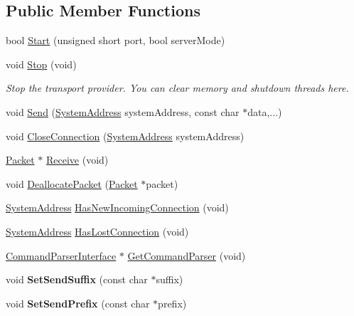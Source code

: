 \subsection*{Public Member Functions}
\begin{DoxyCompactItemize}
\item 
bool \hyperlink{class_rak_net_1_1_telnet_transport_ac7e1ba9b678c42a55d695eb95d734c1f}{Start} (unsigned short port, bool server\-Mode)
\item 
\hypertarget{class_rak_net_1_1_telnet_transport_aed8b626c88d646661364c04fcd3bce42}{void \hyperlink{class_rak_net_1_1_telnet_transport_aed8b626c88d646661364c04fcd3bce42}{Stop} (void)}\label{class_rak_net_1_1_telnet_transport_aed8b626c88d646661364c04fcd3bce42}

\begin{DoxyCompactList}\small\item\em Stop the transport provider. You can clear memory and shutdown threads here. \end{DoxyCompactList}\item 
void \hyperlink{class_rak_net_1_1_telnet_transport_a8ade1309ba09713f3fe9f7039b927a7e}{Send} (\hyperlink{struct_rak_net_1_1_system_address}{System\-Address} system\-Address, const char $\ast$data,...)
\item 
void \hyperlink{class_rak_net_1_1_telnet_transport_af75d0de84994e8f964b14ae8a0b16640}{Close\-Connection} (\hyperlink{struct_rak_net_1_1_system_address}{System\-Address} system\-Address)
\item 
\hyperlink{struct_rak_net_1_1_packet}{Packet} $\ast$ \hyperlink{class_rak_net_1_1_telnet_transport_aa8094ab92c365840955273594a74727d}{Receive} (void)
\item 
void \hyperlink{class_rak_net_1_1_telnet_transport_afca9e49ae0e91c04bfe3426245412023}{Deallocate\-Packet} (\hyperlink{struct_rak_net_1_1_packet}{Packet} $\ast$packet)
\item 
\hyperlink{struct_rak_net_1_1_system_address}{System\-Address} \hyperlink{class_rak_net_1_1_telnet_transport_afc57238959dfd0088900f82c94d2203c}{Has\-New\-Incoming\-Connection} (void)
\item 
\hyperlink{struct_rak_net_1_1_system_address}{System\-Address} \hyperlink{class_rak_net_1_1_telnet_transport_a892143e429d375ddf2cbac2813a04c54}{Has\-Lost\-Connection} (void)
\item 
\hyperlink{class_rak_net_1_1_command_parser_interface}{Command\-Parser\-Interface} $\ast$ \hyperlink{class_rak_net_1_1_telnet_transport_a2712370b9f8ba79908bab6067f3c067e}{Get\-Command\-Parser} (void)
\item 
\hypertarget{class_rak_net_1_1_telnet_transport_a1a555e9646d5d64ce955028cfcab9fb6}{void {\bfseries Set\-Send\-Suffix} (const char $\ast$suffix)}\label{class_rak_net_1_1_telnet_transport_a1a555e9646d5d64ce955028cfcab9fb6}

\item 
\hypertarget{class_rak_net_1_1_telnet_transport_a2d569dadf28b44ca852f182c14098997}{void {\bfseries Set\-Send\-Prefix} (const char $\ast$prefix)}\label{class_rak_net_1_1_telnet_transport_a2d569dadf28b44ca852f182c14098997}

\end{DoxyCompactItemize}
